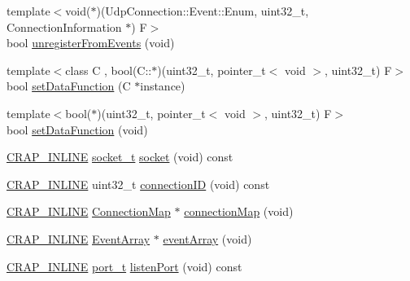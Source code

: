 \begin{DoxyCompactItemize}
\item 
{\footnotesize template$<$void($\ast$)(\+Udp\+Connection\+::\+Event\+::\+Enum, uint32\+\_\+t, Connection\+Information $\ast$) F$>$ }\\bool \hyperlink{classcrap_1_1_udp_connection_aaf7813466db45a74f0c040c55bcf565a}{unregister\+From\+Events} (void)
\item 
{\footnotesize template$<$class C , bool(\+C\+::$\ast$)(uint32\+\_\+t, pointer\+\_\+t$<$ void $>$, uint32\+\_\+t) F$>$ }\\bool \hyperlink{classcrap_1_1_udp_connection_afc74932ea0fd9171b08794c416c29517}{set\+Data\+Function} (C $\ast$instance)
\item 
{\footnotesize template$<$bool($\ast$)(uint32\+\_\+t, pointer\+\_\+t$<$ void $>$, uint32\+\_\+t) F$>$ }\\bool \hyperlink{classcrap_1_1_udp_connection_a7ac8f06170e52e990b4644e0bf248c48}{set\+Data\+Function} (void)
\item 
\hyperlink{config__x86_8h_a5a40526b8d842e7ff731509998bb0f1c}{C\+R\+A\+P\+\_\+\+I\+N\+L\+I\+N\+E} \hyperlink{namespacecrap_af06d7d92e9405fc0750f74417541c2be}{socket\+\_\+t} \hyperlink{classcrap_1_1_udp_connection_a98a7aa822e8df5390c440ef89e372905}{socket} (void) const 
\item 
\hyperlink{config__x86_8h_a5a40526b8d842e7ff731509998bb0f1c}{C\+R\+A\+P\+\_\+\+I\+N\+L\+I\+N\+E} uint32\+\_\+t \hyperlink{classcrap_1_1_udp_connection_a668ddb558d9aabd85d2d51f6018d5f2d}{connection\+I\+D} (void) const 
\item 
\hyperlink{config__x86_8h_a5a40526b8d842e7ff731509998bb0f1c}{C\+R\+A\+P\+\_\+\+I\+N\+L\+I\+N\+E} \hyperlink{classcrap_1_1_udp_connection_a2182c50061f2f64c874b4e74a4de64e9}{Connection\+Map} $\ast$ \hyperlink{classcrap_1_1_udp_connection_afacd5587e778dbba4884dd0b3c5cd08b}{connection\+Map} (void)
\item 
\hyperlink{config__x86_8h_a5a40526b8d842e7ff731509998bb0f1c}{C\+R\+A\+P\+\_\+\+I\+N\+L\+I\+N\+E} \hyperlink{classcrap_1_1_udp_connection_a19d68a5229c759dd795467a73fec47fd}{Event\+Array} $\ast$ \hyperlink{classcrap_1_1_udp_connection_a80e154ebbd477ffd52df97ffdca88ecb}{event\+Array} (void)
\item 
\hyperlink{config__x86_8h_a5a40526b8d842e7ff731509998bb0f1c}{C\+R\+A\+P\+\_\+\+I\+N\+L\+I\+N\+E} \hyperlink{namespacecrap_a21d8c14ae6ca715c519ff369042149dd}{port\+\_\+t} \hyperlink{classcrap_1_1_udp_connection_a2c6699f4265d4c6b58b6b1476d09798e}{listen\+Port} (void) const 
\end{DoxyCompactItemize}


